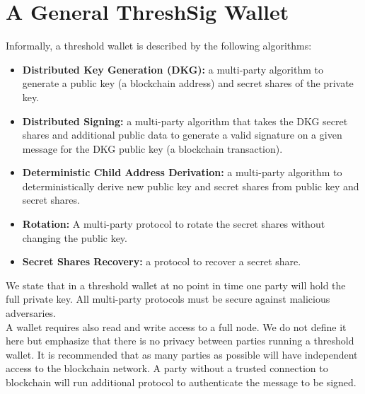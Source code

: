 \documentclass[runningheads]{llncs}
\begin{document}
\section{A General ThreshSig Wallet}
Informally, a threshold wallet is described by the following algorithms:
\begin{itemize}
    \item \textbf{Distributed Key Generation (DKG):} a multi-party algorithm to generate a public key (a blockchain address) and secret shares of the private key.
    \item \textbf{Distributed Signing:} a multi-party algorithm that takes the DKG secret shares and additional public data to generate a valid signature on a given message for the DKG public key (a blockchain transaction).
    \item \textbf{Deterministic Child Address Derivation:} a multi-party algorithm to deterministically derive new public key and secret shares from public key and secret shares.
    \item \textbf{Rotation:} A multi-party protocol to rotate the secret shares without changing the public key.
    \item \textbf{Secret Shares Recovery:} a protocol to recover a secret share.
\end{itemize}
We state that in a threshold wallet at no point in time one party will hold the full private key. All multi-party protocols must be secure against malicious adversaries. \\
A wallet requires also read and write access to a full node. We do not define it here but emphasize that there is no privacy between parties running a threshold wallet. It is recommended that as many parties as possible will have independent access to the blockchain network. A party without a trusted connection to blockchain will run additional protocol to authenticate the message to be signed.
\end{document}
